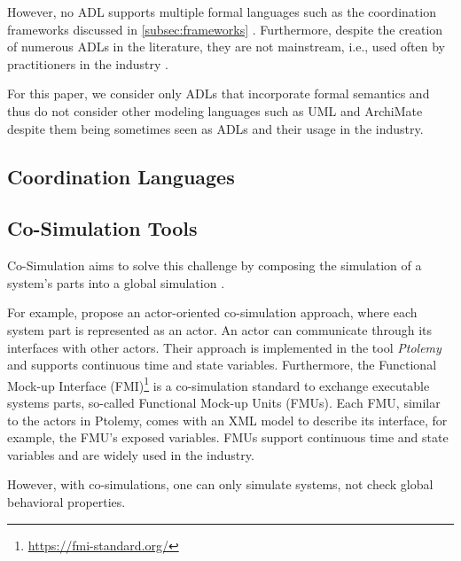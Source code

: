 \documentclass[runningheads]{llncs}
\begin{document}
However, no ADL supports multiple formal languages such as the coordination frameworks discussed in \autoref{subsec:frameworks} \cite{medvidovicClassificationComparisonFramework2000}.
Furthermore, despite the creation of numerous ADLs in the literature, they are not mainstream, i.e., used often by practitioners in the industry \cite{clementsSurveyArchitectureDescription1996,woodsArchitectureDescriptionLanguages2005,pandeyArchitecturalDescriptionLanguages2010,ozkayaAreWeThere2013}.

For this paper, we consider only ADLs that incorporate formal semantics and thus do not consider other modeling languages such as UML \cite{objectmanagementgroupUnifiedModelingLanguage2017} and ArchiMate \cite{theopengroupArchiMateSpecification2023} despite them being sometimes seen as ADLs and their usage in the industry.

\subsection{Coordination Languages}

\subsection{Co-Simulation Tools}
\cite{gomesCoSimulationSurvey2019}

Co-Simulation aims to solve this challenge by composing the simulation of a system's parts into a global simulation \cite{gomesCoSimulationSurvey2019}.

For example, \cite{ekerTamingHeterogeneityPtolemy2003} propose an actor-oriented co-simulation approach, where each system part is represented as an actor.
An actor can communicate through its interfaces with other actors.
Their approach is implemented in the tool \textit{Ptolemy} and supports continuous time and state variables.
Furthermore, the Functional Mock-up Interface (FMI)\footnote{\url{https://fmi-standard.org/}} is a co-simulation standard to exchange executable systems parts, so-called Functional Mock-up Units (FMUs).
Each FMU, similar to the actors in Ptolemy, comes with an XML model to describe its interface, for example, the FMU's exposed variables.
FMUs support continuous time and state variables and are widely used in the industry.

However, with co-simulations, one can only simulate systems, not check global behavioral properties.
\end{document}
